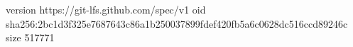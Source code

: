 version https://git-lfs.github.com/spec/v1
oid sha256:2bc1d3f325e7687643c86a1b250037899fdef420fb5a6c0628dc516ccd89246c
size 517771
